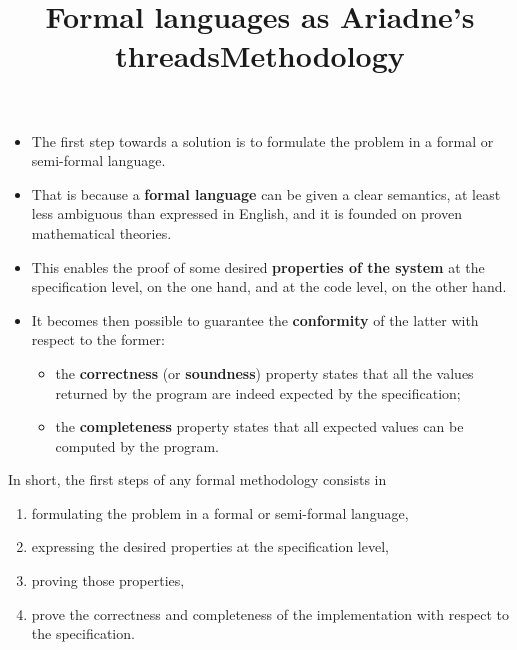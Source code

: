 \documentclass[wide]{slides}
\begin{document}
\begin{slide}
  \title{Formal languages as Ariadne's threads}

  \begin{itemize}

    \item The first step towards a solution is to formulate the
      problem in a formal or semi-formal language.

    \item That is because a \textbf{formal language} can be given a
      clear semantics, at least less ambiguous than expressed in
      English, and it is founded on proven mathematical theories.

    \item This enables the proof of some desired \textbf{properties of
      the system} at the specification level, on the one hand, and at
      the code level, on the other hand.

    \item It becomes then possible to
      guarantee the \textbf{conformity} of the latter with respect to
      the former:
      \begin{itemize}

        \item the \textbf{correctness} (or \textbf{soundness})
          property states that all the values returned by the program
          are indeed expected by the specification;

        \item the \textbf{completeness} property states that all
          expected values can be computed by the program.

      \end{itemize}
  \end{itemize}
\end{slide}

\begin{slide}
  \title{Methodology}

  In short, the first steps of any formal methodology consists in
  \begin{enumerate}

    \item formulating the problem in a formal or semi\hyp{}formal
      language,

    \item expressing the desired properties at the specification
      level,

    \item proving those properties,

    \item prove the correctness and completeness of the implementation
      with respect to the specification.

  \end{enumerate}

\end{slide}
\end{document}
